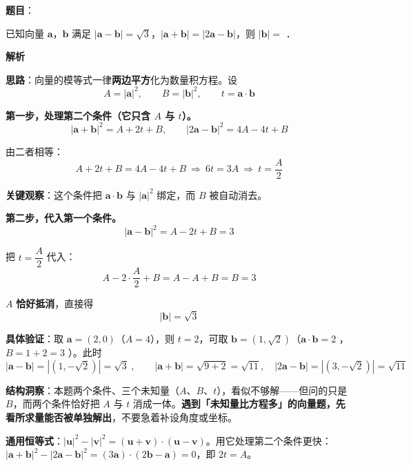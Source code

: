\begin{answer}

\textbf{题目}：

已知向量 $\boldsymbol a$，$\boldsymbol b$ 满足 $|\boldsymbol a-\boldsymbol b|=\sqrt3$，$|\boldsymbol a+\boldsymbol b|=|2\boldsymbol a-\boldsymbol b|$，则 $|\boldsymbol b|=$ \gkblank{}．

\textbf{解析}

\textbf{思路}：向量的模等式一律\textbf{两边平方}化为数量积方程。设
\nopagebreak[4]
\[A=|\boldsymbol a|^{2},\qquad B=|\boldsymbol b|^{2},\qquad t=\boldsymbol a\cdot\boldsymbol b\]

\textbf{第一步，处理第二个条件（它只含 $A$ 与 $t$）。}
\nopagebreak[4]
\[|\boldsymbol a+\boldsymbol b|^{2}=A+2t+B,\qquad |2\boldsymbol a-\boldsymbol b|^{2}=4A-4t+B\]

由二者相等：
\nopagebreak[4]
\[A+2t+B=4A-4t+B\ \Longrightarrow\ 6t=3A\ \Longrightarrow\ t=\frac A2\]

\textbf{关键观察}：这个条件把 $\boldsymbol a\cdot\boldsymbol b$ 与 $|\boldsymbol a|^{2}$ 绑定，而 $B$ 被自动消去。

\textbf{第二步，代入第一个条件。}
\nopagebreak[4]
\[|\boldsymbol a-\boldsymbol b|^{2}=A-2t+B=3\]

把 $t=\dfrac A2$ 代入：
\nopagebreak[4]
\[A-2\cdot\frac A2+B=A-A+B=B=3\]

$A$ \textbf{恰好抵消}，直接得
\nopagebreak[4]
\[|\boldsymbol b|=\sqrt3\]

\textbf{具体验证}：取 $\boldsymbol a=(2,0)$（$A=4$），则 $t=2$，可取 $\boldsymbol b=\left(1,\sqrt2\right)$（$\boldsymbol a\cdot\boldsymbol b=2$ ，$B=1+2=3$ ）。此时
\nopagebreak[4]
\[|\boldsymbol a-\boldsymbol b|=\left|\left(1,-\sqrt2\right)\right|=\sqrt3\ ,\qquad |\boldsymbol a+\boldsymbol b|=\sqrt{9+2}=\sqrt{11},\quad |2\boldsymbol a-\boldsymbol b|=\left|\left(3,-\sqrt2\right)\right|=\sqrt{11}\ \]

\begin{gktip}
\textbf{结构洞察}：本题两个条件、三个未知量（$A$、$B$、$t$），看似不够解——但问的只是 $B$，而两个条件恰好把 $A$ 与 $t$ 消成一体。\textbf{遇到「未知量比方程多」的向量题，先看所求量能否被单独解出}，不要急着补设角度或坐标。

\textbf{通用恒等式}：$|\boldsymbol u|^{2}-|\boldsymbol v|^{2}=(\boldsymbol u+\boldsymbol v)\cdot(\boldsymbol u-\boldsymbol v)$。用它处理第二个条件更快：$|\boldsymbol a+\boldsymbol b|^{2}-|2\boldsymbol a-\boldsymbol b|^{2}=(3\boldsymbol a)\cdot(2\boldsymbol b-\boldsymbol a)=0$，即 $2t=A$。
\end{gktip}


\par\medskip

\end{answer}
